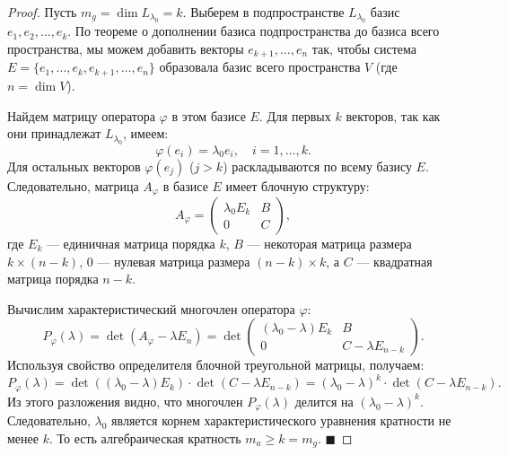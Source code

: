 \begin{proof}
Пусть $m_g = \dim L_{\lambda_0} = k$. Выберем в подпространстве $L_{\lambda_0}$ базис $e_1, e_2, \dots, e_k$. 
По теореме о дополнении базиса подпространства до базиса всего пространства, мы можем добавить векторы $e_{k+1}, \dots, e_n$ так, чтобы система $E = \{e_1, \dots, e_k, e_{k+1}, \dots, e_n\}$ образовала базис всего пространства $V$ (где $n = \dim V$).

Найдем матрицу оператора $\varphi$ в этом базисе $E$. 
Для первых $k$ векторов, так как они принадлежат $L_{\lambda_0}$, имеем:
\[
\varphi(e_i) = \lambda_0 e_i, \quad i = 1, \dots, k.
\]
Для остальных векторов $\varphi(e_j)$ ($j > k$) раскладываются по всему базису $E$. Следовательно, матрица $A_\varphi$ в базисе $E$ имеет блочную структуру:
\[
A_\varphi = \begin{pmatrix}
\lambda_0 E_k & B \\
0 & C
\end{pmatrix},
\]
где $E_k$ --- единичная матрица порядка $k$, $B$ --- некоторая матрица размера $k \times (n-k)$, $0$ --- нулевая матрица размера $(n-k) \times k$, а $C$ --- квадратная матрица порядка $n-k$.

Вычислим характеристический многочлен оператора $\varphi$:
\[
P_\varphi(\lambda) = \det(A_\varphi - \lambda E_n) = \det \begin{pmatrix}
(\lambda_0 - \lambda) E_k & B \\
0 & C - \lambda E_{n-k}
\end{pmatrix}.
\]
Используя свойство определителя блочной треугольной матрицы, получаем:
\[
P_\varphi(\lambda) = \det((\lambda_0 - \lambda) E_k) \cdot \det(C - \lambda E_{n-k}) = (\lambda_0 - \lambda)^k \cdot \det(C - \lambda E_{n-k}).
\]
Из этого разложения видно, что многочлен $P_\varphi(\lambda)$ делится на $(\lambda_0 - \lambda)^k$. Следовательно, $\lambda_0$ является корнем характеристического уравнения кратности не менее $k$. То есть алгебраическая кратность $m_a \ge k = m_g$.
\hfill$\blacksquare$
\end{proof}
